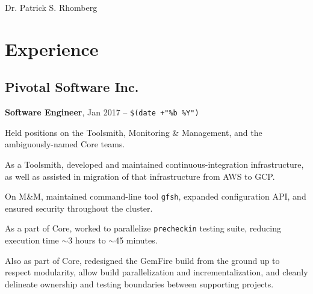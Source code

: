 \documentclass[10pt,letterpaper]{article}
\def\name{Dr. Patrick S. Rhomberg}
\renewenvironment{itemize}{
  \begin{list}{}{
    \setlength{\leftmargin}{1.5em}
    \setlength{\itemsep}{0.25em}
    \setlength{\parskip}{0pt}
    \setlength{\parsep}{0.25em}
  }
}{
  \end{list}
}
\begin{document}
{\huge \name}
\bigskip



\newcommand{\thinNewLineWithQuad}{\par\vspace{-.2em}\quad}

\newcommand{\jobtitle}[1]{\textbf{#1},}
\newcommand{\timeAtJob}[1]{{#1}}
\newcommand{\workplace}[1]{\thinNewLineWithQuad{#1}}


\section*{Experience}
\subsection*{Pivotal Software Inc.}
\begin{itemize}
  \item \jobtitle{Software Engineer} {Jan 2017 -- \verb!$(date +"%b %Y")!}
  \item Held positions on the Toolsmith, Monitoring \& Management, and the ambiguously-named Core teams.
  \item \quad As a Toolsmith, developed and maintained continuous-integration infrastructure, as well as assisted in migration of that infrastructure from AWS to GCP.
  \item \quad On M\&M, maintained command-line tool \verb!gfsh!, expanded configuration API, and ensured security throughout the cluster.
  \item \quad As a part of Core, worked to parallelize \verb!precheckin! testing suite, reducing execution time $\sim$3 hours to $\sim$45 minutes.
  \item \quad Also as part of Core, redesigned the GemFire build from the ground up to respect modularity, allow build parallelization and incrementalization, and cleanly delineate ownership and testing boundaries between supporting projects.
\end{itemize}
\end{document}
